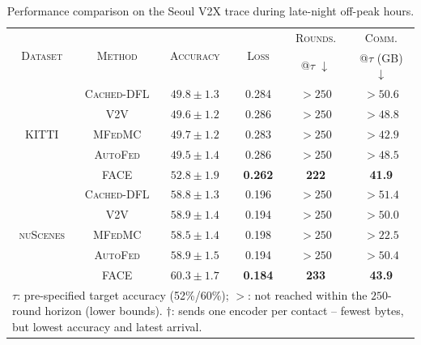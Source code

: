 \begin{table}[t]
    \centering
\caption{Performance comparison on the Seoul V2X trace during late-night off-peak hours.}
    \label{tab:seoul_night}
    \footnotesize
    \renewcommand{\arraystretch}{1.0}
    \setlength{\tabcolsep}{3pt}
    \begin{tabular}{c|c|c|c|c|c}
        \toprule
        \multirow{2}{*}{\textsc{Dataset}}
        & \multirow{2}{*}{\textsc{Method}}
        & \multirow{2}{*}{\textsc{Accuracy}}
        & \multirow{2}{*}{\textsc{Loss}}
        & \textsc{Rounds.}
        & \textsc{Comm.} \\

        &
        &
        &
        & @$\tau$ $\downarrow$
        & @$\tau$ (GB) $\downarrow$ \\
        \midrule

        \multirow{5}{*}{\textsc{KITTI}}
        & \textsc{Cached-DFL}
        & $49.8 \pm 1.3$
        & 0.284
        & $>250$
        & $>50.6$ \\

        & \textsc{V2V}
        & $49.6 \pm 1.2$
        & 0.286
        & $>250$
        & $>48.8$ \\[1pt]

        & \textsc{MFedMC}
        & $49.7 \pm 1.2$
        & 0.283
        & $>250$
        & $>42.9$ \\

        & \textsc{AutoFed}
        & $49.5 \pm 1.4$
        & 0.286
        & $>250$
        & $>48.5$ \\[1pt]

        & \textsc{FACE}
        & $\mathbf{52.8 \pm 1.9}$
        & \textbf{0.262}
        & \textbf{222}
        & \textbf{41.9} \\

        \midrule

        \multirow{5}{*}{\textsc{nuScenes}}
        & \textsc{Cached-DFL}
        & $58.8 \pm 1.3$
        & 0.196
        & $>250$
        & $>51.4$ \\

        & \textsc{V2V}
        & $58.9 \pm 1.4$
        & 0.194
        & $>250$
        & $>50.0$ \\[1pt]

        & \textsc{MFedMC}
        & $58.5 \pm 1.4$
        & 0.198
        & $>250$
        & $>22.5$ \\

        & \textsc{AutoFed}
        & $58.9 \pm 1.5$
        & 0.194
        & $>250$
        & $>50.4$ \\[1pt]

        & \textsc{FACE}
        & $\mathbf{60.3 \pm 1.7}$
        & \textbf{0.184}
        & \textbf{233}
        & \textbf{43.9} \\

        \bottomrule
        \multicolumn{6}{l}{
            \scriptsize $\tau$: pre-specified target accuracy (52\%/60\%); $>$: not reached within the $250$-round horizon (lower bounds). $\dagger$: sends one encoder per contact -- fewest bytes, but lowest accuracy and latest arrival.
        }
    \end{tabular}
\end{table}
